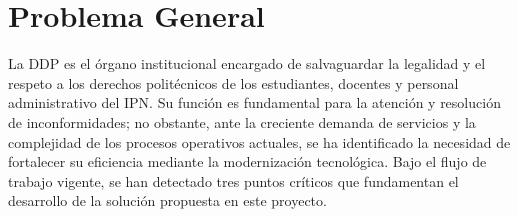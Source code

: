 \section{Problema General}

\begin{flushleft}
\justifying
La DDP es el órgano institucional encargado de salvaguardar la legalidad y el respeto a los derechos politécnicos de los estudiantes, docentes y personal administrativo del IPN. Su función es fundamental para la atención y resolución de inconformidades; no obstante, ante la creciente demanda de servicios y la complejidad de los procesos operativos actuales, se ha identificado la necesidad de fortalecer su eficiencia mediante la modernización tecnológica. Bajo el flujo de trabajo vigente, se han detectado tres puntos críticos que fundamentan el desarrollo de la solución propuesta en este proyecto.
\end{flushleft}